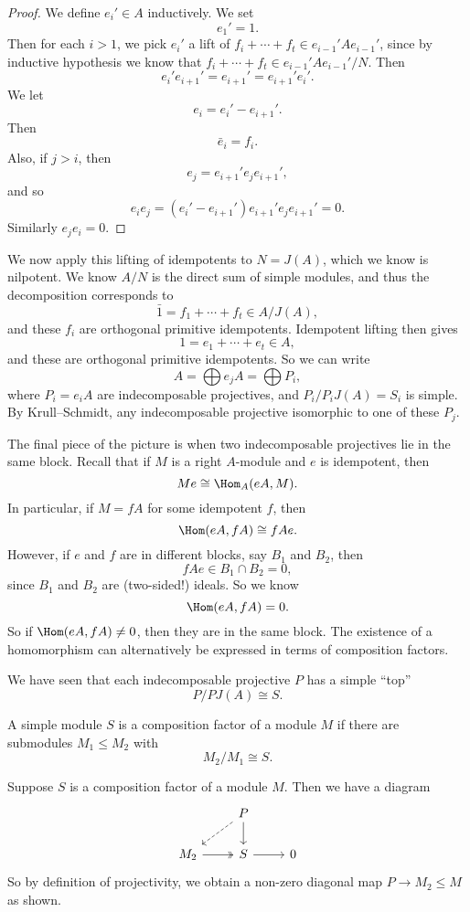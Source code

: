 \documentclass[a4paper]{article}
\begin{document}
\begin{proof}
  We define $e_i' \in A$ inductively. We set
  \[
    e_1' = 1.
  \]
  Then for each $i > 1$, we pick $e_i'$ a lift of $f_i + \cdots + f_t \in e_{i - 1}' A e_{i - 1}'$, since by inductive hypothesis we know that $f_i + \cdots + f_t \in e_{i - 1}' A e_{i - 1}'/N$. Then
  \[
    e_i' e_{i + 1}' = e_{i + 1}' = e_{i + 1}' e_i'.
  \]
  We let
  \[
    e_i = e_i'- e_{i + 1}'.
  \]
  Then
  \[
    \bar{e}_i = f_i.
  \]
  Also, if $j > i$, then
  \[
    e_j = e_{i + 1}' e_j e_{i + 1}',
  \]
  and so
  \[
    e_i e_j = (e_i' - e_{i + 1}') e_{i + 1}' e_j e_{i + 1}' = 0.
  \]
  Similarly $e_j e_i = 0$.
\end{proof}

We now apply this lifting of idempotents to $N = J(A)$, which we know is nilpotent. We know $A/N$ is the direct sum of simple modules, and thus the decomposition corresponds to
\[
  \bar{1} = f_1 + \cdots + f_t \in A/J(A),
\]
and these $f_i$ are orthogonal primitive idempotents. Idempotent lifting then gives
\[
  1 = e_1 + \cdots + e_t \in A,
\]
and these are orthogonal primitive idempotents. So we can write
\[
  A = \bigoplus e_j A = \bigoplus P_i,
\]
where $P_i = e_i A$ are indecomposable projectives, and $P_i/P_i J(A) = S_i$ is simple. By Krull--Schmidt, any indecomposable projective isomorphic to one of these $P_j$.

The final piece of the picture is when two indecomposable projectives lie in the same block. Recall that if $M$ is a right $A$-module and $e$ is idempotent, then
\[
  Me \cong \Hom_A(eA, M).
\]
In particular, if $M = fA$ for some idempotent $f$, then
\[
  \Hom(eA, fA) \cong fAe.
\]
However, if $e$ and $f$ are in different blocks, say $B_1$ and $B_2$, then
\[
  fAe \in B_1 \cap B_2 = 0,
\]
since $B_1$ and $B_2$ are (two-sided!) ideals. So we know
\[
  \Hom(eA, fA) = 0.
\]
So if $\Hom(eA, fA) \not= 0$, then they are in the same block. The existence of a homomorphism can alternatively be expressed in terms of composition factors.

We have seen that each indecomposable projective $P$ has a simple ``top''
\[
  P/PJ(A) \cong S.
\]
\begin{defi}
  A simple module $S$ is a composition factor of a module $M$ if there are submodules $M_1 \leq M_2$ with
  \[
    M_2/M_1 \cong S.
  \]
\end{defi}
Suppose $S$ is a composition factor of a module $M$. Then we have a diagram
\[
  \begin{tikzcd}
    & P \ar[d] \ar[dl, dashed]\\
     M_2 \ar[r, two heads ] & S \ar[r] & 0
  \end{tikzcd}
\]
So by definition of projectivity, we obtain a non-zero diagonal map $P \to M_2 \leq M$ as shown.
\end{document}

